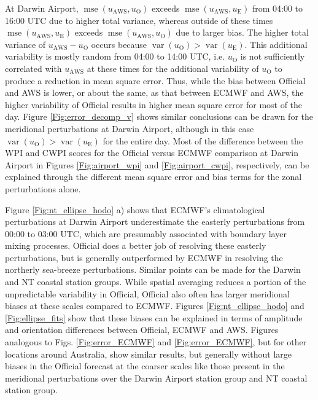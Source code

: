 \documentclass[twocol]{ametsoc}
\DeclareMathOperator{\mse}{mse}
\DeclareMathOperator{\var}{var}
\begin{document}
At Darwin Airport, $\mse\left(u_\text{AWS}, u_\text{O}\right)$ exceeds $\mse\left(u_\text{AWS}, u_\text{E}\right)$ from 04:00 to 16:00 UTC due to higher total variance, whereas outside of these times $\mse\left(u_\text{AWS}, u_\text{E}\right)$ exceeds $\mse\left(u_\text{AWS}, u_\text{O}\right)$ due to larger bias. The higher total variance of $u_\text{AWS} - u_\text{O}$ occurs because $\var\left(u_\text{O}\right) > \var\left(u_\text{E}\right)$. This additional variability is mostly random from 04:00 to 14:00 UTC, i.e. $u_\text{O}$ is not sufficiently correlated with $u_\text{AWS}$ at these times for the additional variability of $u_\text{O}$ to produce a reduction in mean square error. Thus, while the bias between Official and AWS is lower, or about the same, as that between ECMWF and AWS, the higher variability of Official results in higher mean square error for most of the day. Figure \ref{Fig:error_decomp_v} shows similar conclusions can be drawn for the meridional perturbations at Darwin Airport, although in this case $\var\left(u_\text{O}\right) > \var\left(u_\text{E}\right)$ for the entire day. Most of the difference between the WPI and CWPI scores for the Official versus ECMWF comparison at Darwin Airport in Figures \ref{Fig:airport_wpi} and \ref{Fig:airport_cwpi}, respectively, can be explained through the different mean square error and bias terms for the zonal perturbations alone. 



Figure \ref{Fig:nt_ellipse_hodo} a) shows that ECMWF's climatological perturbations at Darwin Airport underestimate the easterly perturbations from 00:00 to 03:00 UTC, which are presumably associated with boundary layer mixing processes. Official does a better job of resolving these easterly perturbations, but is generally outperformed by ECMWF in resolving the northerly sea-breeze perturbations. Similar points can be made for the Darwin and NT coastal station groups. While spatial averaging reduces a portion of the unpredictable variability in Official, Official also often has larger meridional biases at these scales compared to ECMWF. Figures \ref{Fig:nt_ellipse_hodo} and \ref{Fig:ellipse_fits} show that these biases can be explained in terms of amplitude and orientation differences between Official, ECMWF and AWS. Figures analogous to Figs. \ref{Fig:error_ECMWF} and \ref{Fig:error_ECMWF}, but for other locations around Australia, show similar results, but generally without large biases in the Official forecast at the coarser scales like those present in the meridional perturbations over the Darwin Airport station group and NT coastal station group.   
\end{document}
